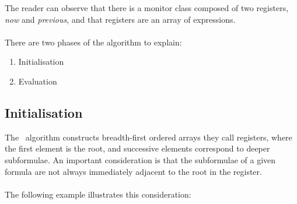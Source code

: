 The reader can observe that there is a monitor class composed of two registers, \textit{now} and \textit{previous}, and that registers are an array of expressions.\\
\\
There are two phases of the algorithm to explain:

\begin{enumerate}
\item Initialisation %
\item Evaluation %
\end{enumerate}

\subsection{Initialisation}
\label{sec:Initialisation}

The \RH\ algorithm constructs breadth-first ordered arrays they call registers, where the first element is the root, and successive elements correspond to deeper subformulae.  An important consideration is that the subformulae of a given formula are not always immediately adjacent to the root in the register.\\
\\
The following example illustrates this consideration:

